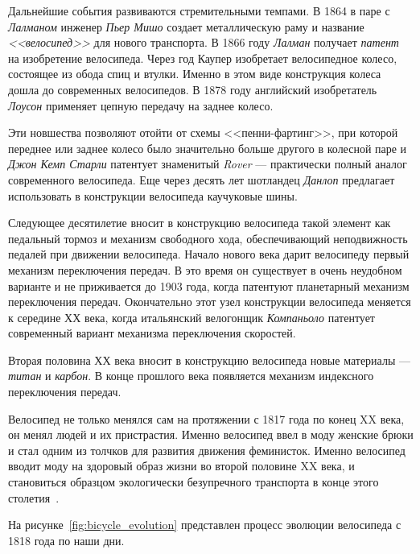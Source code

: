 Дальнейшие события развиваются стремительными темпами. В 1864 в паре с \textit{Лалманом}
инженер \textit{Пьер Мишо} создает металлическую раму и название \textit{<<велосипед>>}
для нового транспорта. В 1866 году \textit{Лалман} получает \textit{патент} на изобретение велосипеда.
Через год Каупер изобретает велосипедное колесо, состоящее из обода спиц и втулки.
Именно в этом виде конструкция колеса дошла до современных велосипедов.
В 1878 году английский изобретатель \textit{Лоусон} применяет цепную передачу на заднее колесо.

Эти новшества позволяют отойти от схемы <<пенни-фартинг>>, при которой переднее
или заднее колесо было значительно больше другого в колесной паре и
\textit{Джон Кемп Старли} патентует знаменитый \textit{Rover} --- практически полный аналог
современного велосипеда. Еще через десять лет шотландец \textit{Данлоп} предлагает
использовать в конструкции велосипеда каучуковые шины.

Следующее десятилетие вносит в конструкцию велосипеда такой элемент как педальный тормоз
и механизм свободного хода, обеспечивающий неподвижность педалей при движении велосипеда.
Начало нового века дарит велосипеду первый механизм переключения передач. В это время
он существует в очень неудобном варианте и не приживается до 1903 года, когда патентуют
планетарный механизм переключения передач. Окончательно этот узел конструкции велосипеда
меняется к середине ХХ века, когда итальянский велогонщик \textit{Компаньоло}
патентует современный вариант механизма переключения скоростей.

Вторая половина ХХ века вносит в конструкцию велосипеда новые материалы ---
\textit{титан} и \textit{карбон}. В конце прошлого века появляется механизм
индексного переключения передач.

Велосипед не только менялся сам на протяжении с 1817 года по конец XX века,
он менял людей и их пристрастия. Именно велосипед ввел в моду женские брюки и стал
одним из толчков для развития движения феминисток. Именно велосипед вводит моду
на здоровый образ жизни во второй половине XX века, и становиться образцом
экологически безупречного транспорта в конце этого столетия~\cite{bicycle_history}.

На рисунке~\ref{fig:bicycle_evolution} представлен процесс эволюции велосипеда
с 1818 года по наши дни.

